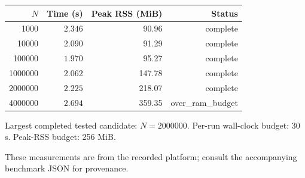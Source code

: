 \begin{tabular}{rrrr}\toprule $N$ & Time (s) & Peak RSS (MiB) & Status \\\midrule
1000 & $2.346$ & 90.96 & complete \\
10000 & $2.090$ & 91.29 & complete \\
100000 & $1.970$ & 95.27 & complete \\
1000000 & $2.062$ & 147.78 & complete \\
2000000 & $2.225$ & 218.07 & complete \\
4000000 & $2.694$ & 359.35 & over\_ram\_budget \\
\bottomrule\end{tabular}
\par\smallskip Largest completed tested candidate: $N=2000000$. 
Per-run wall-clock budget: 30 s. 
Peak-RSS budget: 256 MiB. 
\par\smallskip 
These measurements are from the recorded platform; consult the accompanying benchmark JSON for provenance.
